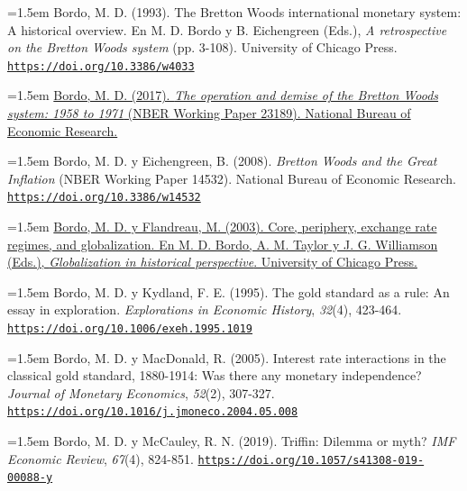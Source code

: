 \documentclass[10pt,a4paper]{article}
\begin{document}
{\sloppy\noindent\hangindent=1.5em Bordo, M. D. (1993). The Bretton Woods international monetary system: A historical overview. En M. D. Bordo y B. Eichengreen (Eds.), \textit{A retrospective on the Bretton Woods system} (pp. 3-108). University of Chicago Press. \href{https://doi.org/10.3386/w4033}{\nolinkurl{https://doi.org/10.3386/w4033}}\par}

{\sloppy\noindent\hangindent=1.5em \href{https://www.nber.org/papers/w23189.pdf}{Bordo, M. D. (2017). \textit{The operation and demise of the Bretton Woods system: 1958 to 1971} (NBER Working Paper 23189). National Bureau of Economic Research.}\par}

{\sloppy\noindent\hangindent=1.5em Bordo, M. D. y Eichengreen, B. (2008). \textit{Bretton Woods and the Great Inflation} (NBER Working Paper 14532). National Bureau of Economic Research. \href{https://doi.org/10.3386/w14532}{\nolinkurl{https://doi.org/10.3386/w14532}}\par}

{\sloppy\noindent\hangindent=1.5em \href{https://www.nber.org/books-and-chapters/globalization-historical-perspective/core-periphery-exchange-rate-regimes-and-globalization}{Bordo, M. D. y Flandreau, M. (2003). Core, periphery, exchange rate regimes, and globalization. En M. D. Bordo, A. M. Taylor y J. G. Williamson (Eds.), \textit{Globalization in historical perspective}. University of Chicago Press.}\par}

{\sloppy\noindent\hangindent=1.5em Bordo, M. D. y Kydland, F. E. (1995). The gold standard as a rule: An essay in exploration. \textit{Explorations in Economic History}, \textit{32}(4), 423-464. \href{https://doi.org/10.1006/exeh.1995.1019}{\nolinkurl{https://doi.org/10.1006/exeh.1995.1019}}\par}

{\sloppy\noindent\hangindent=1.5em Bordo, M. D. y MacDonald, R. (2005). Interest rate interactions in the classical gold standard, 1880-1914: Was there any monetary independence? \textit{Journal of Monetary Economics}, \textit{52}(2), 307-327. \href{https://doi.org/10.1016/j.jmoneco.2004.05.008}{\nolinkurl{https://doi.org/10.1016/j.jmoneco.2004.05.008}}\par}

{\sloppy\noindent\hangindent=1.5em Bordo, M. D. y McCauley, R. N. (2019). Triffin: Dilemma or myth? \textit{IMF Economic Review}, \textit{67}(4), 824-851. \href{https://doi.org/10.1057/s41308-019-00088-y}{\nolinkurl{https://doi.org/10.1057/s41308-019-00088-y}}\par}
\end{document}
